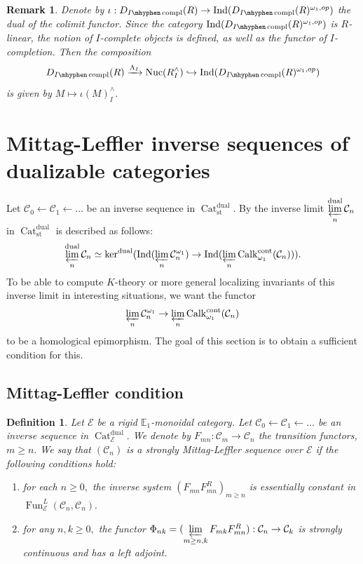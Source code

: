 \documentclass[11pt,leqno]{amsart}
\newtheorem{defi}[theo]{Definition}
\newtheorem{remark}[theo]{Remark}
\numberwithin{equation}{section}
\newcommand{\hy}{\mhyphen}
\newcommand{\prolim}[1][]{\mathop{\varprojlim}\limits_{#1}}
\newcommand{\xto}{\xrightarrow}
\newcommand{\hto}{\hookrightarrow}
\newcommand{\leftto}{\leftarrow}
\newcommand{\Nuc}{\operatorname{Nuc}}
\newcommand{\Cat}{\operatorname{Cat}}
\newcommand{\cont}{\operatorname{cont}}
\newcommand{\st}{\operatorname{st}}
\newcommand{\dual}{\operatorname{dual}}
\newcommand{\bE}{{\mathbb E}}
\newcommand{\cC}{{\mathcal C}}
\newcommand{\cE}{{\mathcal E}}
\newcommand{\Fun}{\operatorname{Fun}}
\newcommand{\Ind}{\operatorname{Ind}}
\newcommand{\Calk}{\operatorname{Calk}}
\newcommand{\compl}{\operatorname{compl}}
\begin{document}
\begin{remark}
Denote by $\iota:D_{I\hy\compl}(R)\to\Ind(D_{I\hy\compl}(R)^{\omega_1,op})$ the dual of the colimit functor. Since the category $\Ind(D_{I\hy\compl}(R)^{\omega_1,op})$ is $R$-linear, the notion of $I$-complete objects is defined, as well as the functor of $I$-completion. Then the composition  $$D_{I\hy\compl}(R)\xto{\Lambda_I}\Nuc(R^{\wedge}_I)\hto \Ind(D_{I\hy\compl}(R)^{\omega_1,op})$$
is given by $M\mapsto \iota(M)^{\wedge}_I.$
\end{remark}

\section{Mittag-Leffler inverse sequences of dualizable categories}
\label{sec:Mittag-Leffler}

Let $\cC_0\leftto \cC_1\leftto\dots$ be an inverse sequence in $\Cat_{\st}^{\dual}.$ By \cite[Theorem 1.91]{E24} the inverse limit $\prolim[n]^{\dual}\cC_n$ in $\Cat_{\st}^{\dual}$ is described as follows:
\begin{equation*}
\prolim[n]^{\dual}\cC_n\simeq\ker^{\dual}(\Ind(\prolim[n]\cC_n^{\omega_1})\to\Ind(\prolim[n]\Calk_{\omega_1}^{\cont}(\cC_n))).
\end{equation*} 
To be able to compute $K$-theory or more general localizing invariants of this inverse limit in interesting situations, we want the functor
\begin{equation*}
\prolim[n]\cC_n^{\omega_1}\to \prolim[n]\Calk_{\omega_1}^{\cont}(\cC_n)
\end{equation*}
to be a homological epimorphism. The goal of this section is to obtain a sufficient condition for this.

\subsection{Mittag-Leffler condition}

\begin{defi}\label{def:strong_ML} Let $\cE$ be a rigid $\bE_1$-monoidal category. Let $\cC_0\leftto\cC_1\leftto\dots$ be an inverse sequence in $\Cat_{\cE}^{\dual}.$ We denote by $F_{mn}:\cC_m\to\cC_n$ the transition functors, $m\geq n.$ We say that $(\cC_n)$ is a strongly Mittag-Leffler sequence over $\cE$ if the following conditions hold:
	\begin{enumerate}[label=(\roman*),ref=(\roman*)]
		\item for each $n\geq 0,$ the inverse system $(F_{mn}F_{mn}^R)_{m\geq n}$ is essentially constant in $\Fun_{\cE}^L(\cC_n,\cC_n).$ \label{ML1}
		
	\item for any $n,k\geq 0,$ the functor $\Phi_{nk}=(\prolim[m\geq n,k]F_{mk}F_{mn}^R):\cC_n\to\cC_k$ is strongly continuous and has a left adjoint.\label{ML2} 
	\end{enumerate}
\end{defi}
\end{document}
